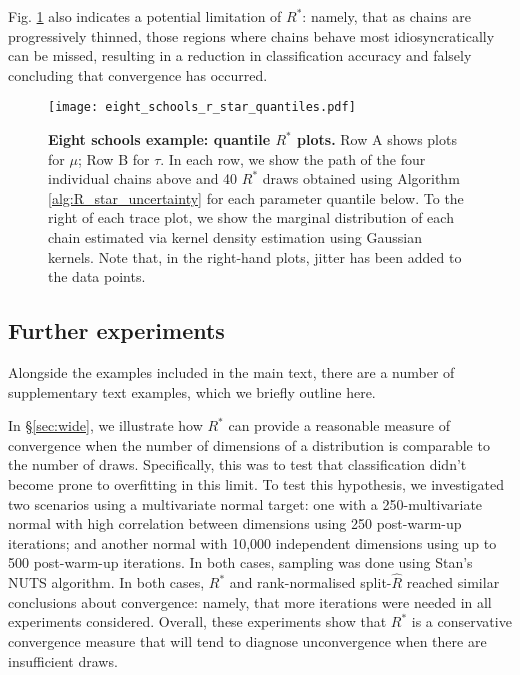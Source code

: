\documentclass{article}
\begin{document}
Fig. \ref{fig:eight_schools_r_star_quantiles} also indicates a potential limitation of $R^*$: namely, that as chains are progressively thinned, those regions where chains behave most idiosyncratically can be missed, resulting in a reduction in classification accuracy and falsely concluding that convergence has occurred.

\begin{figure}[!htb]
	\centerline{\texttt{[image: eight\_schools\_r\_star\_quantiles.pdf]}}
	\caption{\textbf{Eight schools example: quantile $R^*$ plots.} Row A shows plots for $\mu$; Row B for $\tau$. In each row, we show the path of the four individual chains above and 40 $R^*$ draws obtained using Algorithm \ref{alg:R_star_uncertainty} for each parameter quantile below. To the right of each trace plot, we show the marginal distribution of each chain estimated via kernel density estimation using Gaussian kernels. Note that, in the right-hand plots, jitter has been added to the data points.}
	\label{fig:eight_schools_r_star_quantiles}
\end{figure}


\subsection{Further experiments}\label{sec:further_experiments}
Alongside the examples included in the main text, there are a number of supplementary text examples, which we briefly outline here.

In \S\ref{sec:wide}, we illustrate how $R^*$ can provide a reasonable measure of convergence when the number of dimensions of a distribution is comparable to the number of draws. Specifically, this was to test that classification didn't become prone to overfitting in this limit. To test this hypothesis, we investigated two scenarios using a multivariate normal target: one with a 250-multivariate normal with high correlation between dimensions using 250 post-warm-up iterations; and another normal with 10,000 independent dimensions using up to 500 post-warm-up iterations. In both cases, sampling was done using Stan's NUTS algorithm. In both cases, $R^*$ and rank-normalised split-$\widehat{R}$ reached similar conclusions about convergence: namely, that more iterations were needed in all experiments considered. Overall, these experiments show that $R^*$ is a conservative convergence measure that will tend to diagnose unconvergence when there are insufficient draws.
\end{document}
